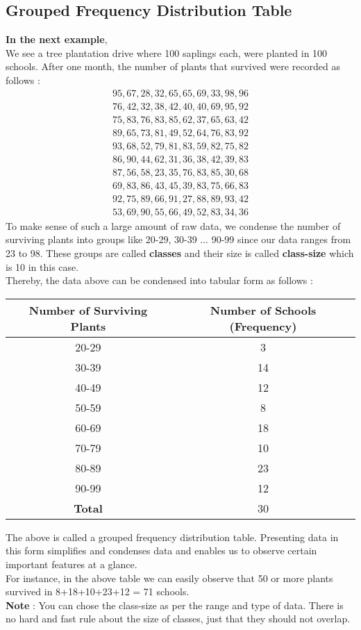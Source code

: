 \documentclass[12pt, letterpaper]{article}
\begin{document}
\subsection{Grouped Frequency Distribution Table}
\textbf{In the next example},\\
We see a tree plantation drive where 100 saplings each, were planted in 100 schools. After one month, the number of plants that survived were recorded as follows :
\begin{align*}
    95,67,28,32,65,65,69,33,98,96 \\
    76,42,32,38,42,40,40,69,95,92 \\
    75,83,76,83,85,62,37,65,63,42 \\
    89,65,73,81,49,52,64,76,83,92 \\
    93,68,52,79,81,83,59,82,75,82 \\
    86,90,44,62,31,36,38,42,39,83 \\
    87,56,58,23,35,76,83,85,30,68 \\
    69,83,86,43,45,39,83,75,66,83 \\
    92, 75,89,66,91,27,88,89,93,42 \\
    53,69,90,55,66,49,52,83,34,36
\end{align*}
To make sense of such a large amount of raw data, we condense the number of surviving plants into groups like 20-29, 30-39 ... 90-99 since our data ranges from 23 to 98. These groups are called \textbf{classes} and their size is called \textbf{class-size} which is 10 in this case.\\
Thereby, the data above can be condensed into tabular form as follows : 
\begin{center}
\begin{tabular}{ |c|c| } 
 \hline
 \textbf{Number of Surviving Plants} & \textbf{Number of Schools (Frequency)} \\
 \hline
 20-29 & 3 \\ 
 30-39 & 14 \\
 40-49 & 12 \\
 50-59 & 8 \\
 60-69 & 18 \\
 70-79 & 10 \\
 80-89 & 23 \\
 90-99 & 12 \\
 \hline
 \textbf{Total} & 30 \\
 \hline
\end{tabular}
\end{center}
The above is called a grouped frequency distribution table. Presenting data in this form simplifies and condenses data and enables us to observe certain important features at a glance.\\
For instance, in the above table we can easily observe that 50 or more plants survived in 8+18+10+23+12 = 71 schools.\\
\textbf{Note} : You can chose the class-size as per the range and type of data. There is no hard and fast rule about the size of classes, just that they should not overlap.
\end{document}
